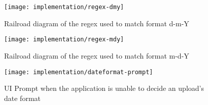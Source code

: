 \begin{figure}[h]
    \centering
    \texttt{[image: implementation/regex-dmy]}
    \caption[Regular expression used to match d-m-Y]{Railroad diagram of the regex used to match format d-m-Y}
    \label{fig:regex-dmy}
\end{figure}

\begin{figure}[h]
    \centering
    \texttt{[image: implementation/regex-mdy]}
    \caption[Regular expression used to match m-d-Y]{Railroad diagram of the regex used to match format m-d-Y}
    \label{fig:regex-mdy}
\end{figure}

\begin{figure}[h]
    \centering
    \texttt{[image: implementation/dateformat-prompt]}
    \caption[UI Prompt asking for date format]{UI Prompt when the application is unable to decide an upload's date format}
    \label{fig:dateformat-prompt}
\end{figure}

